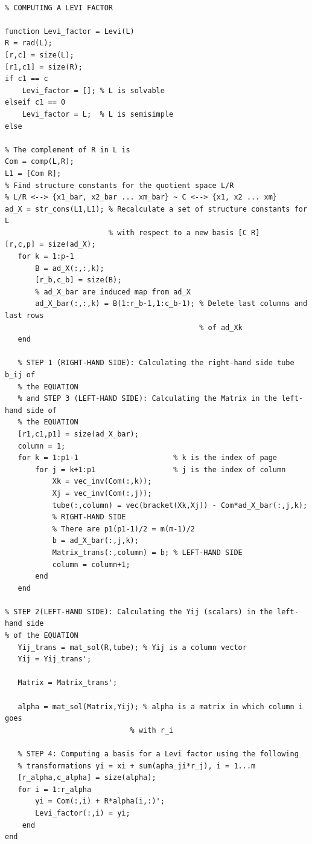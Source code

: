 \documentclass[11pt,a4paper]{article}
\begin{document}
\begin{appendices}
\begin{verbatim}

% COMPUTING A LEVI FACTOR 

function Levi_factor = Levi(L)
R = rad(L);
[r,c] = size(L);
[r1,c1] = size(R);
if c1 == c
    Levi_factor = []; % L is solvable
elseif c1 == 0
    Levi_factor = L;  % L is semisimple
else

% The complement of R in L is
Com = comp(L,R);
L1 = [Com R];
% Find structure constants for the quotient space L/R
% L/R <--> {x1_bar, x2_bar ... xm_bar} ~ C <--> {x1, x2 ... xm}
ad_X = str_cons(L1,L1); % Recalculate a set of structure constants for L
                        % with respect to a new basis [C R]
[r,c,p] = size(ad_X);
   for k = 1:p-1
       B = ad_X(:,:,k);
       [r_b,c_b] = size(B);
       % ad_X_bar are induced map from ad_X
       ad_X_bar(:,:,k) = B(1:r_b-1,1:c_b-1); % Delete last columns and last rows
                                             % of ad_Xk
   end
   
   % STEP 1 (RIGHT-HAND SIDE): Calculating the right-hand side tube b_ij of 
   % the EQUATION
   % and STEP 3 (LEFT-HAND SIDE): Calculating the Matrix in the left-hand side of 
   % the EQUATION
   [r1,c1,p1] = size(ad_X_bar);
   column = 1;
   for k = 1:p1-1                      % k is the index of page
       for j = k+1:p1                  % j is the index of column
           Xk = vec_inv(Com(:,k));
           Xj = vec_inv(Com(:,j));
           tube(:,column) = vec(bracket(Xk,Xj)) - Com*ad_X_bar(:,j,k);
           % RIGHT-HAND SIDE
           % There are p1(p1-1)/2 = m(m-1)/2
           b = ad_X_bar(:,j,k);
           Matrix_trans(:,column) = b; % LEFT-HAND SIDE
           column = column+1;
       end
   end

% STEP 2(LEFT-HAND SIDE): Calculating the Yij (scalars) in the left-hand side
% of the EQUATION
   Yij_trans = mat_sol(R,tube); % Yij is a column vector
   Yij = Yij_trans';

   Matrix = Matrix_trans';

   alpha = mat_sol(Matrix,Yij); % alpha is a matrix in which column i goes
                             % with r_i

   % STEP 4: Computing a basis for a Levi factor using the following
   % transformations yi = xi + sum(apha_ji*r_j), i = 1...m
   [r_alpha,c_alpha] = size(alpha);
   for i = 1:r_alpha
       yi = Com(:,i) + R*alpha(i,:)';
       Levi_factor(:,i) = yi; 
    end
end

\end{verbatim}


\end{appendices}
\end{document}
